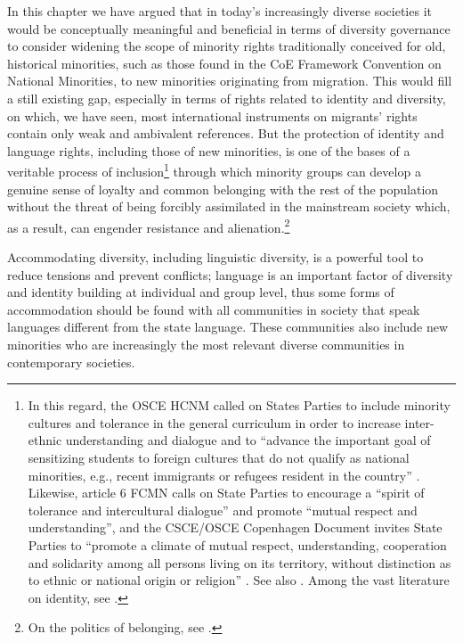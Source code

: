 \documentclass[output=paper,colorlinks,citecolor=brown]{langscibook}
\begin{document}
In this chapter we have argued that in today's increasingly diverse societies it would be conceptually meaningful and beneficial in terms of diversity governance to consider widening the scope of minority rights traditionally conceived for old, historical minorities, such as those found in the CoE Framework Convention on National Minorities, to new minorities originating from migration. This would fill a still existing gap, especially in terms of rights related to identity and diversity, on which, we have seen, most international instruments on migrants' rights contain only weak and ambivalent references. But the protection of identity and language rights, including those of new minorities, is one of the bases of a veritable process of inclusion\footnote{In this regard, the OSCE HCNM called on States Parties to include minority cultures and tolerance in the general curriculum in order to increase inter-ethnic understanding and dialogue and to ``advance the important goal of sensitizing students to foreign cultures that do not qualify as national minorities, e.g., recent immigrants or refugees resident in the country'' \citep{osce_hcnm1997}. Likewise, article 6 FCMN calls on State Parties to encourage a ``spirit of tolerance and intercultural dialogue'' and promote ``mutual respect and understanding'', and the CSCE/OSCE Copenhagen Document invites State Parties to ``promote a climate of mutual respect, understanding, cooperation and solidarity among all persons living on its territory, without distinction as to ethnic or national origin or religion'' \citep{csce_osce1990}. See also \citet{eu2005_commonagenda,eu_ec_handbook_integration,eu_council_meeting2618_2004,osce_hcnm2006}. Among the vast literature on identity, see \citet{parekh2008,guild2004,nazroo_karlsen2003}.} through which minority groups can develop a genuine sense of loyalty and common belonging with the rest of the population without the threat of being forcibly assimilated in the mainstream society which, as a result, can engender resistance and alienation.\footnote{On the politics of belonging, see \citet{yuval-davis2006_art,geddes_favell1999}.}

Accommodating diversity, including linguistic diversity, is a powerful tool to reduce tensions and prevent conflicts; language is an important factor of diversity and identity building at individual and group level, thus some forms of accommodation should be found with all communities in society that speak languages different from the state language. These communities also include new minorities who are increasingly the most relevant diverse communities in contemporary societies.
\end{document}
